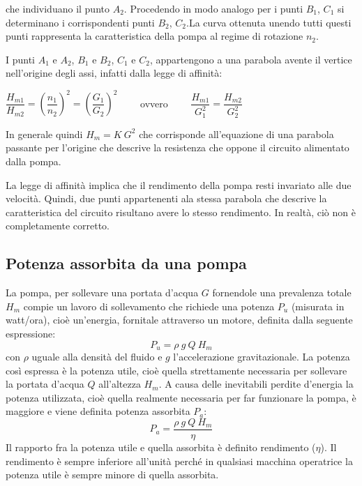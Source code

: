 \documentclass[laurea,oneside,11pt]{USiena_tesiLM}
\begin{document}
che individuano il punto $A_2$. Procedendo in modo analogo per i punti $B_1$, $C_1$ si determinano i corrispondenti punti $B_2$, $C_2$.La curva ottenuta unendo tutti questi punti rappresenta la caratteristica della pompa al regime di rotazione $n_2$.

I punti $A_1$ e $A_2$, $B_1$ e $B_2$, $C_1$ e $C_2$, appartengono a una parabola avente il vertice nell'origine degli assi, infatti dalla legge di affinità:
\begin{center}
$\dfrac{H_{m1}}{H_{m2}}=\left(\dfrac{n_1}{n_2} \right)^2 = \left(\dfrac{G_1}{G_2} \right)^2  \qquad$ ovvero   $\qquad \dfrac{H_{m1}}{G_1^2}=\dfrac{H_{m2}}{G_2^2}$ 
\end{center}
In generale quindi $H_m = K \ G^2$ che corrisponde all'equazione di una parabola passante per l'origine che descrive la resistenza che oppone il circuito alimentato dalla pompa.

La legge di affinità implica che il rendimento della pompa resti invariato alle due velocità. Quindi, due punti appartenenti ala stessa parabola che descrive la caratteristica del circuito risultano avere lo stesso rendimento. In realtà, ciò non è completamente corretto.


\subsection{Potenza assorbita da una pompa}
La pompa, per sollevare una portata d'acqua $G$ fornendole una prevalenza totale $H_m$ compie un lavoro di sollevamento che richiede una potenza $P_u$ (misurata in watt/ora), cioè un'energia, fornitale attraverso un motore, definita dalla seguente espressione:
\begin{equation}
P_u = \rho \ g \ Q \ H_m
\end{equation}
con $\rho$ uguale alla densità del fluido e $g$ l'accelerazione gravitazionale.
La potenza così espressa è la potenza utile, cioè quella strettamente necessaria per sollevare la portata d'acqua $Q$ all'altezza $H_m$. A causa delle inevitabili perdite d'energia la potenza utilizzata, cioè quella realmente necessaria per far funzionare la pompa, è maggiore e viene definita potenza assorbita $P_a$:
\begin{equation}
P_a = \dfrac{\rho \ g \ Q \ H_m}{\eta}
\end{equation}
Il rapporto fra la potenza utile e quella assorbita è definito rendimento ($\eta$). Il rendimento è sempre inferiore all'unità perché in qualsiasi macchina operatrice la potenza utile è sempre minore di quella assorbita. 
\end{document}
